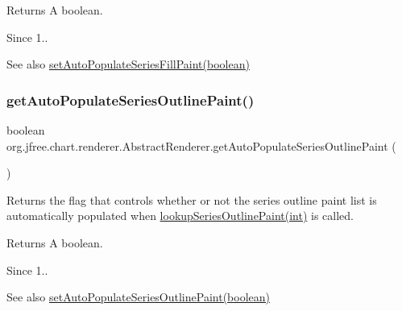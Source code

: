 \begin{DoxyReturn}{Returns}
A boolean.
\end{DoxyReturn}
\begin{DoxySince}{Since}
1..
\end{DoxySince}
\begin{DoxySeeAlso}{See also}
\mbox{\hyperlink{classorg_1_1jfree_1_1chart_1_1renderer_1_1_abstract_renderer_a93616ea6bf29500cc4b9d632f676c204}{set\+Auto\+Populate\+Series\+Fill\+Paint(boolean)}} 
\end{DoxySeeAlso}
\mbox{\label{classorg_1_1jfree_1_1chart_1_1renderer_1_1_abstract_renderer_ab1e91f057f52655aafe373c454e5f828}} 
\subsubsection{\texorpdfstring{get\+Auto\+Populate\+Series\+Outline\+Paint()}{getAutoPopulateSeriesOutlinePaint()}}
{\footnotesize\ttfamily boolean org.\+jfree.\+chart.\+renderer.\+Abstract\+Renderer.\+get\+Auto\+Populate\+Series\+Outline\+Paint (\begin{DoxyParamCaption}{ }\end{DoxyParamCaption})}

Returns the flag that controls whether or not the series outline paint list is automatically populated when \mbox{\hyperlink{classorg_1_1jfree_1_1chart_1_1renderer_1_1_abstract_renderer_a1e691b145468f90219f5883f146664f5}{lookup\+Series\+Outline\+Paint(int)}} is called.

\begin{DoxyReturn}{Returns}
A boolean.
\end{DoxyReturn}
\begin{DoxySince}{Since}
1..
\end{DoxySince}
\begin{DoxySeeAlso}{See also}
\mbox{\hyperlink{classorg_1_1jfree_1_1chart_1_1renderer_1_1_abstract_renderer_a8874e4c097e5fe9779d3476c55b17a99}{set\+Auto\+Populate\+Series\+Outline\+Paint(boolean)}} 
\end{DoxySeeAlso}
\mbox{\label{classorg_1_1jfree_1_1chart_1_1renderer_1_1_abstract_renderer_a0bee4fb1848ef723f35ddd8085c5f1ce}} 
